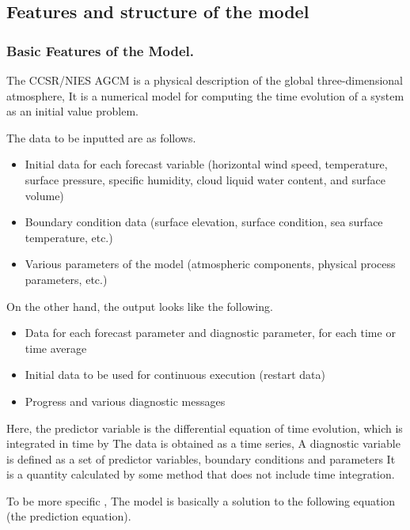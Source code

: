 \hypertarget{features-and-structure-of-the-model}{%
\subsection{Features and structure of the
model}\label{features-and-structure-of-the-model}}

\hypertarget{basic-features-of-the-model.}{%
\subsubsection{Basic Features of the
Model.}\label{basic-features-of-the-model.}}

The CCSR/NIES AGCM is a physical description of the global
three-dimensional atmosphere, It is a numerical model for computing the
time evolution of a system as an initial value problem.

The data to be inputted are as follows.

\begin{itemize}
\item
  Initial data for each forecast variable (horizontal wind speed,
  temperature, surface pressure, specific humidity, cloud liquid water
  content, and surface volume)
\item
  Boundary condition data (surface elevation, surface condition, sea
  surface temperature, etc.)
\item
  Various parameters of the model (atmospheric components, physical
  process parameters, etc.)
\end{itemize}

On the other hand, the output looks like the following.

\begin{itemize}
\item
  Data for each forecast parameter and diagnostic parameter, for each
  time or time average
\item
  Initial data to be used for continuous execution (restart data)
\item
  Progress and various diagnostic messages
\end{itemize}

Here, the predictor variable is the differential equation of time
evolution, which is integrated in time by The data is obtained as a time
series, A diagnostic variable is defined as a set of predictor
variables, boundary conditions and parameters It is a quantity
calculated by some method that does not include time integration.

To be more specific , The model is basically a solution to the following
equation (the prediction equation).

